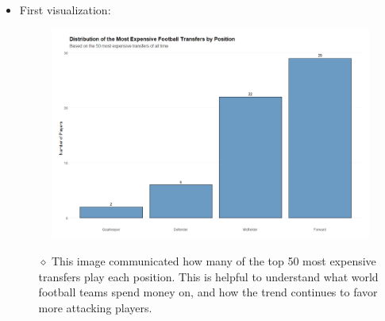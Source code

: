 \documentclass[12pt,letterpaper]{article}
\begin{document}
\newpage %
\vspace*{2cm}
\begin{itemize}
    \item First visualization:
        \begin{figure}[h!]  
            \centering
            \includegraphics[width=1\textwidth]{PS6a_Williams.png}
        \end{figure}
            \begin{itemize}
            \item[$\diamond$] This image communicated how many of the top 50 most expensive transfers play each position. This is helpful to understand what world football teams spend money on, and how the trend continues to favor more attacking players. 
             \end{itemize}
\end{itemize}
\newpage
\vspace*{2cm}
\end{document}
